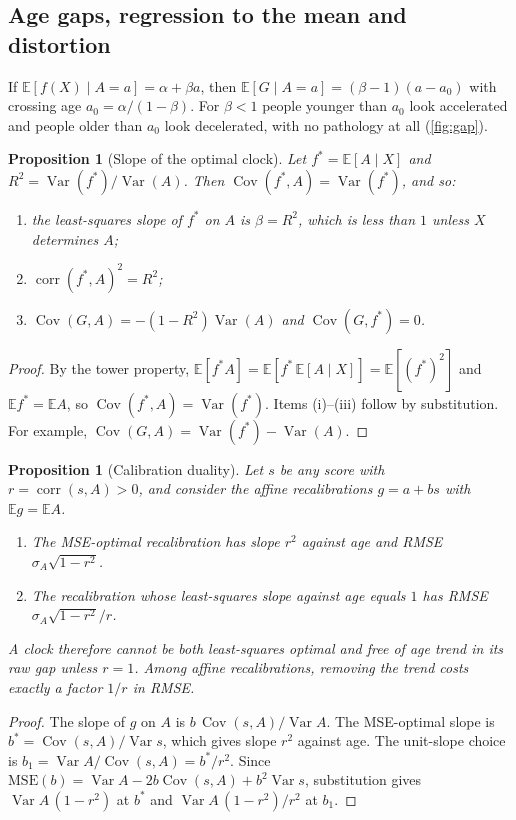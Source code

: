 \documentclass[11pt,a4paper]{article}
\theoremstyle{plain}
\newtheorem{proposition}[theorem]{Proposition}
\theoremstyle{definition}
\theoremstyle{remark}
\newcommand{\tagbox}[2]{\tcbox[on line,boxsep=1pt,left=2pt,right=2pt,top=0pt,bottom=0pt,
  colback=#1!12!white,colframe=#1,boxrule=0.4pt,arc=1pt]{\scriptsize\bfseries\color{#1}#2}}
\newcommand{\NEW}{\tagbox{plum}{NEW HERE}}
\newcommand{\E}{\mathbb{E}}
\newcommand{\Var}{\operatorname{Var}}
\newcommand{\Cov}{\operatorname{Cov}}
\newcommand{\corr}{\operatorname{corr}}
\begin{document}
\subsection{Age gaps, regression to the mean and distortion}
\label{sec:gap}

If $\E[f(X)\mid A=a]=\alpha+\beta a$, then
$\E[G\mid A=a]=(\beta-1)(a-a_0)$ with crossing age $a_0=\alpha/(1-\beta)$. For $\beta<1$ people younger than $a_0$ look accelerated and people older than $a_0$ look decelerated, with no pathology at all (\cref{fig:gap}).

\begin{proposition}[Slope of the optimal clock] \NEW
\label{prop:gap}
Let $f^*=\E[A\mid X]$ and $R^2=\Var(f^*)/\Var(A)$. Then $\Cov(f^*,A)=\Var(f^*)$, and so:
\begin{enumerate}
\item the least-squares slope of $f^*$ on $A$ is $\beta=R^2$, which is less than $1$ unless $X$ determines $A$;
\item $\corr(f^*,A)^2=R^2$;
\item $\Cov(G,A)=-(1-R^2)\Var(A)$ and $\Cov(G,f^*)=0$.
\end{enumerate}
\end{proposition}
\begin{proof}
By the tower property, $\E[f^*A]=\E[f^*\,\E[A\mid X]]=\E[(f^*)^2]$ and $\E f^*=\E A$, so $\Cov(f^*,A)=\Var(f^*)$. Items (i)--(iii) follow by substitution. For example, $\Cov(G,A)=\Var(f^*)-\Var(A)$.
\end{proof}

\begin{proposition}[Calibration duality] \NEW
\label{prop:duality}
Let $s$ be any score with $r=\corr(s,A)>0$, and consider the affine recalibrations $g=a+bs$ with $\E g=\E A$.
\begin{enumerate}
\item The MSE-optimal recalibration has slope $r^2$ against age and RMSE $\sigma_A\sqrt{1-r^2}$.
\item The recalibration whose least-squares slope against age equals $1$ has RMSE $\sigma_A\sqrt{1-r^2}/r$.
\end{enumerate}
A clock therefore cannot be both least-squares optimal and free of age trend in its raw gap unless $r=1$. Among affine recalibrations, removing the trend costs exactly a factor $1/r$ in RMSE.
\end{proposition}
\begin{proof}
The slope of $g$ on $A$ is $b\,\Cov(s,A)/\Var A$. The MSE-optimal slope is $b^*=\Cov(s,A)/\Var s$, which gives slope $r^2$ against age. The unit-slope choice is $b_1=\Var A/\Cov(s,A)=b^*/r^2$. Since $\mathrm{MSE}(b)=\Var A-2b\Cov(s,A)+b^2\Var s$, substitution gives $\Var A\,(1-r^2)$ at $b^*$ and $\Var A\,(1-r^2)/r^2$ at $b_1$.
\end{proof}
\end{document}
